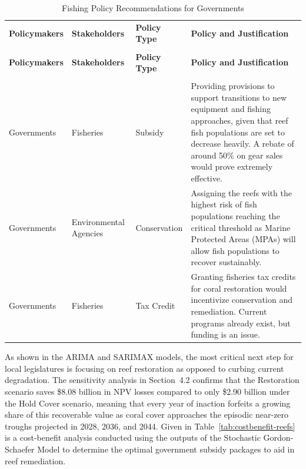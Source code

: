 \documentclass[10pt,letterpaper]{article}
\begin{document}
\begingroup
{}
\renewcommand{\arraystretch}{1.1}
\begin{xltabular}{\textwidth}{>{\centering\arraybackslash}p{2.2cm}
                >{\centering\arraybackslash}p{2.4cm}
                >{\centering\arraybackslash}p{2.4cm}
                >{\centering\arraybackslash}X}
\caption{Fishing Policy Recommendations for Governments}
\label{tab:fishing-policy}\\
\toprule
{}\textbf{Policymakers} & \textbf{Stakeholders} & \textbf{Policy Type} & \textbf{Policy and Justification} \\
\midrule
\endfirsthead
{} \\[4pt]
\toprule
{}\textbf{Policymakers} & \textbf{Stakeholders} & \textbf{Policy Type} & \textbf{Policy and Justification} \\
\midrule
\endhead
\midrule
{} \\
\endfoot
\bottomrule
\endlastfoot
Governments & Fisheries & Subsidy & Providing provisions to support transitions to new equipment and fishing approaches, given that reef fish populations are set to decrease heavily. A rebate of around 50\% on gear sales would prove extremely effective. \\
Governments & Environmental Agencies & Conservation & Assigning the reefs with the highest risk of fish populations reaching the critical threshold as Marine Protected Areas (MPAs) will allow fish populations to recover sustainably. \\
Governments & Fisheries & Tax Credit & Granting fisheries tax credits for coral restoration would incentivize conservation and remediation. Current programs already exist, but funding is an issue. \\
\end{xltabular}
\endgroup

As shown in the ARIMA and SARIMAX models, the most critical next step for local legislatures is focusing on reef restoration as opposed to curbing current degradation. The sensitivity analysis in Section~4.2 confirms that the Restoration scenario saves \$8.08 billion in NPV losses compared to only \$2.90 billion under the Hold Cover scenario, meaning that every year of inaction forfeits a growing share of this recoverable value as coral cover approaches the episodic near-zero troughs projected in 2028, 2036, and 2044. Given in Table~\ref{tab:costbenefit-reefs} is a cost-benefit analysis conducted using the outputs of the Stochastic Gordon-Schaefer Model to determine the optimal government subsidy packages to aid in reef remediation.
\end{document}
